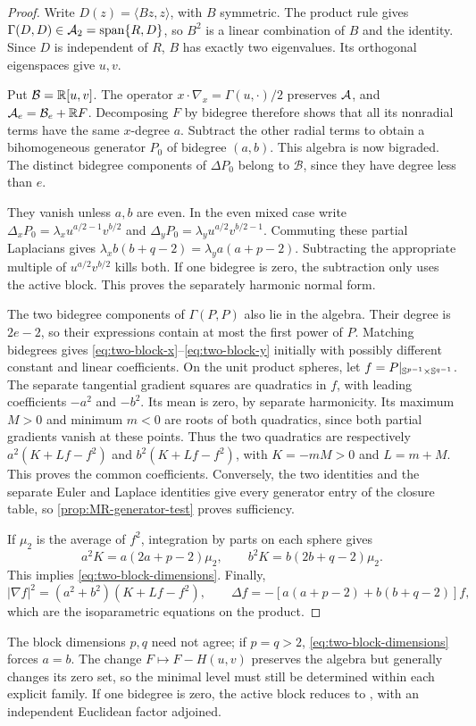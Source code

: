 \begin{proof}
Write $D(z)=\langle Bz,z\rangle$, with $B$ symmetric. The product
rule gives $\Gamma(D,D)\in\mathcal A_2=\operatorname{span}\{R,D\}$,
so $B^2$ is a linear combination of $B$ and the identity. Since
$D$ is independent of $R$, $B$ has exactly two eigenvalues.
Its orthogonal eigenspaces give $u,v$.

Put $\mathcal B=\mathbb R[u,v]$. The operator
$x\cdot\nabla_x=\Gamma(u,\cdot)/2$ preserves $\mathcal A$, and
$\mathcal A_e=\mathcal B_e+\mathbb R F$. Decomposing $F$ by bidegree therefore
shows that all its nonradial terms have the same $x$-degree $a$.
Subtract the other radial terms to obtain a bihomogeneous generator
$P_0$ of bidegree $(a,b)$. This algebra is now bigraded. The distinct
bidegree components of $\Delta P_0$ belong to $\mathcal B$, since
they have degree less than $e$.

They vanish unless $a,b$ are even. In the even mixed case write
$\Delta_xP_0=\lambda_xu^{a/2-1}v^{b/2}$ and
$\Delta_yP_0=\lambda_yu^{a/2}v^{b/2-1}$. Commuting these partial
Laplacians gives
$\lambda_x b(b+q-2)=\lambda_y a(a+p-2)$.
Subtracting the appropriate multiple of $u^{a/2}v^{b/2}$ kills
both. If one bidegree is zero, the subtraction only uses the active
block. This proves the separately harmonic normal form.

The two bidegree components of $\Gamma(P,P)$ also lie in the
algebra. Their degree is $2e-2$, so their expressions contain at
most the first power of $P$. Matching bidegrees gives
\eqref{eq:two-block-x}--\eqref{eq:two-block-y} initially with
possibly different constant and linear coefficients. On the unit
product spheres, let $f=P|_{\mathbb S^{p-1}\times\mathbb S^{q-1}}$.
The separate tangential gradient squares are quadratics in $f$,
with leading coefficients $-a^2$ and $-b^2$. Its mean is zero,
by separate harmonicity. Its maximum $M>0$ and minimum $m<0$
are roots of both quadratics, since both partial gradients vanish
at these points. Thus the two quadratics are respectively
$a^2(K+Lf-f^2)$ and $b^2(K+Lf-f^2)$, with
$K=-mM>0$ and $L=m+M$. This proves the common coefficients.
Conversely, the two identities and the separate Euler and Laplace
identities give every generator entry of the closure table, so
\cref{prop:MR-generator-test} proves sufficiency.

If $\mu_2$ is the average of $f^2$, integration by parts on each
sphere gives
\[
 a^2K=a(2a+p-2)\mu_2,\qquad
 b^2K=b(2b+q-2)\mu_2.
\]
This implies \eqref{eq:two-block-dimensions}. Finally,
\[
 |\nabla f|^2=(a^2+b^2)(K+Lf-f^2),\qquad
 \Delta f=-[a(a+p-2)+b(b+q-2)]f,
\]
which are the isoparametric equations on the product.
\end{proof}

The block dimensions $p,q$ need
not agree; if $p=q>2$, \eqref{eq:two-block-dimensions} forces $a=b$.
The change $F\mapsto F-H(u,v)$ preserves the algebra but generally
changes its zero set, so the minimal level must still be determined
within each explicit family. If one bidegree is zero, the active block
reduces to \cite[Proposition~37(c)]{MendesRadeschi}, with an independent
Euclidean factor adjoined.

